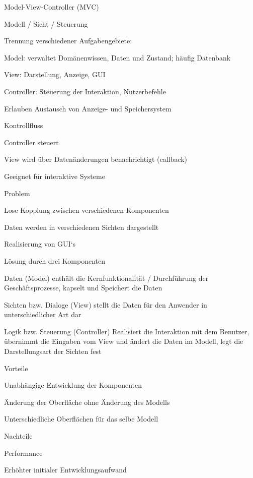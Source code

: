 \documentclass[a4paper]{article}
\begin{document}
\begin{multicols}{3}
  Model-View-Controller (MVC)
  \begin{itemize*}
    \item Modell / Sicht / Steuerung
    \item Trennung verschiedener Aufgabengebiete:
    \begin{itemize*}
      \item Model: verwaltet Domänenwissen, Daten und Zustand; häufig Datenbank
      \item View: Darstellung, Anzeige, GUI
      \item Controller: Steuerung der Interaktion, Nutzerbefehle
    \end{itemize*}
    \item Erlauben Austausch von Anzeige- und Speichersystem
    \item Kontrollfluss
    \begin{itemize*}
      \item Controller steuert
      \item View wird über Datenänderungen benachrichtigt (callback)
    \end{itemize*}
    \item Geeignet für interaktive Systeme
    \item Problem
    \begin{itemize*}
      \item Lose Kopplung zwischen verschiedenen Komponenten
      \item Daten werden in verschiedenen Sichten dargestellt
      \item Realisierung von GUI‘s
    \end{itemize*}
    \item Lösung durch drei Komponenten
    \begin{itemize*}
      \item Daten (Model) enthält die Kernfunktionalität / Durchführung der Geschäftsprozesse, kapselt und Speichert die Daten
      \item Sichten bzw. Dialoge (View) stellt die Daten für den Anwender in unterschiedlicher Art dar
      \item Logik bzw. Steuerung (Controller) Realisiert die Interaktion mit dem Benutzer, übernimmt die Eingaben vom View und ändert die Daten im Modell, legt die Darstellungsart der Sichten fest
    \end{itemize*}
    \item Vorteile
    \begin{itemize*}
      \item Unabhängige Entwicklung der Komponenten
      \item Änderung der Oberfläche ohne Änderung des Modells
      \item Unterschiedliche Oberflächen für das selbe Modell
    \end{itemize*}
    \item Nachteile
    \begin{itemize*}
      \item Performance
      \item Erhöhter initialer Entwicklungsaufwand
    \end{itemize*}
  \end{itemize*}



\end{multicols}
\end{document}
